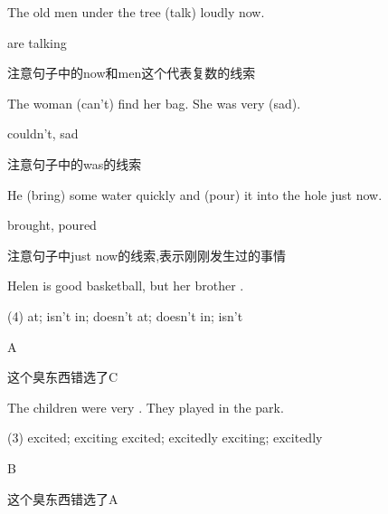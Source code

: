 
\begin{question}[tags={xiaoxuect}]
The old men under the tree \blank[width=1.5cm]{}(talk) loudly now.
\end{question}
\begin{solution}
are talking

注意句子中的now和men这个代表复数的线索
\end{solution}

\begin{question}[tags={xiaoxuect}]
The woman \blank[width=1cm]{}(can't) find her bag. She was very \blank[width=1cm]{}(sad).
\end{question}
\begin{solution}
couldn't, sad

注意句子中的was的线索
\end{solution}

\begin{question}[tags={xiaoxuect}]
He \blank[width=1cm]{}(bring) some water quickly and \blank[width=1cm]{}(pour) it into the hole just now.
\end{question}
\begin{solution}
brought, poured

注意句子中just now的线索,表示刚刚发生过的事情
\end{solution}


\begin{question}[tags={xiaoxuect}]
Helen is good \blank[width=1cm]{} basketball, but her brother \blank[width=1cm]{}.

  \begin{tasks}(4)
    \task at; isn't
    \task in; doesn't
    \task at; doesn't
    \task in; isn't
  \end{tasks}
\end{question}
\begin{solution}
A

这个臭东西错选了C
\end{solution}

\begin{question}[tags={xiaoxuect}]
The children were very \blank[width=1cm]{}. They played \blank[width=1cm]{} in the park.

  \begin{tasks}(3)
    \task excited; exciting
    \task excited; excitedly
    \task exciting; excitedly
  \end{tasks}
\end{question}
\begin{solution}
B

这个臭东西错选了A
\end{solution}

